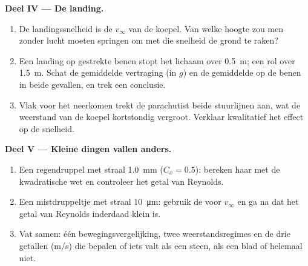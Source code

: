 \begin{problem}
\medskip
\noindent\textbf{Deel IV --- De landing.}
\begin{enumerate}[resume]
  \item De landingssnelheid is de $v_\infty$ van de koepel. Van welke hoogte
        zou men zonder lucht moeten springen om met die snelheid de grond te
        raken?
  \item Een landing op gestrekte benen stopt het lichaam over \qty{0.5}{m}; een rol
        over \qty{1.5}{m}. Schat de gemiddelde vertraging (in $g$) en
        de gemiddelde  op de benen in beide gevallen, en trek een conclusie.
  \item Vlak voor het neerkomen trekt de parachutist beide stuurlijnen aan,
        wat de weerstand van de koepel kortstondig vergroot. Verklaar kwalitatief
        het effect op de snelheid.
\end{enumerate}

\medskip
\noindent\textbf{Deel V --- Kleine dingen vallen anders.}
\begin{enumerate}[resume]
  \item Een regendruppel met straal \qty{1.0}{mm} ($C_x = 0.5$): bereken haar
         met de kwadratische wet en controleer het getal van
        Reynolds.
  \item Een mistdruppeltje met straal \qty{10}{\micro m}: gebruik de 
        voor $v_\infty$ en ga na dat het getal van Reynolds inderdaad
        klein is.
  \item Vat samen: één bewegingsvergelijking, twee weerstandsregimes en de
        drie getallen (\unit{m/s}) die bepalen of iets valt
        als een steen, als een blad of helemaal niet.
\end{enumerate}
\end{problem}
